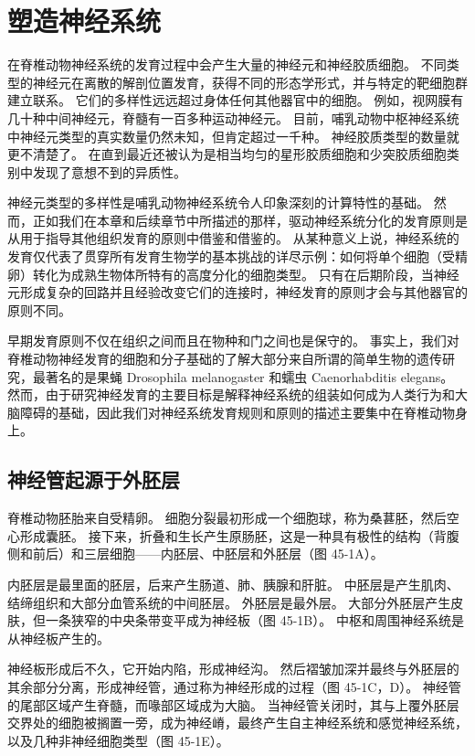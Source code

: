 \chapter{塑造神经系统} \label{chap:chap45}
在脊椎动物神经系统的发育过程中会产生大量的神经元和神经胶质细胞。 不同类型的神经元在离散的解剖位置发育，获得不同的形态学形式，并与特定的靶细胞群建立联系。 它们的多样性远远超过身体任何其他器官中的细胞。 例如，视网膜有几十种中间神经元，脊髓有一百多种运动神经元。 目前，哺乳动物中枢神经系统中神经元类型的真实数量仍然未知，但肯定超过一千种。 神经胶质类型的数量就更不清楚了。 在直到最近还被认为是相当均匀的星形胶质细胞和少突胶质细胞类别中发现了意想不到的异质性。

神经元类型的多样性是哺乳动物神经系统令人印象深刻的计算特性的基础。 然而，正如我们在本章和后续章节中所描述的那样，驱动神经系统分化的发育原则是从用于指导其他组织发育的原则中借鉴和借鉴的。 从某种意义上说，神经系统的发育仅代表了贯穿所有发育生物学的基本挑战的详尽示例：如何将单个细胞（受精卵）转化为成熟生物体所特有的高度分化的细胞类型。 只有在后期阶段，当神经元形成复杂的回路并且经验改变它们的连接时，神经发育的原则才会与其他器官的原则不同。

早期发育原则不仅在组织之间而且在物种和门之间也是保守的。 事实上，我们对脊椎动物神经发育的细胞和分子基础的了解大部分来自所谓的简单生物的遗传研究，最著名的是果蝇 Drosophila melanogaster 和蠕虫 Caenorhabditis elegans。 然而，由于研究神经发育的主要目标是解释神经系统的组装如何成为人类行为和大脑障碍的基础，因此我们对神经系统发育规则和原则的描述主要集中在脊椎动物身上。

\section{神经管起源于外胚层}

脊椎动物胚胎来自受精卵。 细胞分裂最初形成一个细胞球，称为桑葚胚，然后空心形成囊胚。 接下来，折叠和生长产生原肠胚，这是一种具有极性的结构（背腹侧和前后）和三层细胞——内胚层、中胚层和外胚层（图 45-1A）。

内胚层是最里面的胚层，后来产生肠道、肺、胰腺和肝脏。 中胚层是产生肌肉、结缔组织和大部分血管系统的中间胚层。 外胚层是最外层。 大部分外胚层产生皮肤，但一条狭窄的中央条带变平成为神经板（图 45-1B）。 中枢和周围神经系统是从神经板产生的。

神经板形成后不久，它开始内陷，形成神经沟。 然后褶皱加深并最终与外胚层的其余部分分离，形成神经管，通过称为神经形成的过程（图 45-1C，D）。 神经管的尾部区域产生脊髓，而喙部区域成为大脑。 当神经管关闭时，其与上覆外胚层交界处的细胞被搁置一旁，成为神经嵴，最终产生自主神经系统和感觉神经系统，以及几种非神经细胞类型（图 45-1E）。

